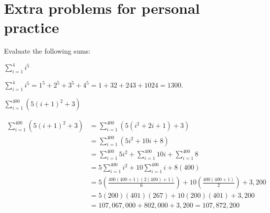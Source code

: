 \documentclass[handout, nooutcomes]{ximera}
\renewenvironment{freeResponse}{
\ifhandout\setbox0\vbox\bgroup\else
\begin{trivlist}\item[\hskip \labelsep\bfseries Solution:\hspace{2ex}]
\fi}
{\ifhandout\egroup\else
\end{trivlist}
\fi}
\begin{document}
\section{Extra problems for personal practice}    

\begin{problem}
  Evaluate the following sums:
  \begin{enumerate}
  \item $\sum_{i=1}^{4} i^5 $
    \begin{freeResponse}
      $\sum_{i=1}^{4} i^5 = 1^5 + 2^5 + 3^5 + 4^5 = 1 + 32 + 243 +
      1024 = 1300$.
    \end{freeResponse}

  \item $\sum_{i=1}^{400} (5(i+1)^2 + 3) $
    \begin{freeResponse}
      \begin{align*}
        \sum_{i=1}^{400} (5(i+1)^2 + 3) 
        &= \sum_{i=1}^{400} (5(i^2 + 2i + 1) + 3) \\
        &= \sum_{i=1}^{400} (5i^2 + 10i + 8) \\
        &= \sum_{i=1}^{400} 5i^2 + \sum_{i=1}^{400} 10i + \sum_{i=1}^{400} 8  \\
        &= 5\sum_{i=1}^{400} i^2 + 10 \sum_{i=1}^{400} i + 8(400)  \\
        &= 5 \left( \frac{400(400+1)(2(400) + 1)}{6} \right) + 10 \left( \frac{400(400+1)}{2} \right) + 3,200  \\
        &= 5 (200)(401)(267) + 10(200)(401) + 3,200  \\
        &= 107,067,000 + 802,000 + 3,200 = 107,872,200
      \end{align*}
    \end{freeResponse}
  \end{enumerate}
\end{problem}
\end{document}
